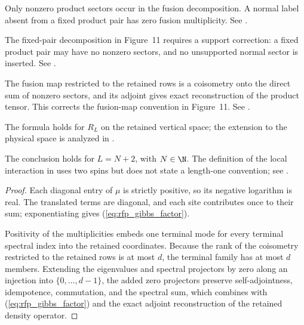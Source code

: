 \begin{lemma}
    Only nonzero product sectors occur in the fusion decomposition. A normal
    label absent from a fixed product pair has zero fusion multiplicity. See
    \cite{gap:cpsv16_bnt_uniqueness_zero_coefficient}.

    The fixed-pair decomposition in Figure~11 requires a support correction:
    a fixed product pair may have no nonzero sectors, and no unsupported
    normal sector is inserted. See
    \cite{gap:cpsv16_figure11_per_pair_support}.

    The fusion map restricted to the retained rows is a coisometry onto the
    direct sum of nonzero sectors, and its adjoint gives exact reconstruction
    of the product tensor. This corrects the fusion-map convention in
    Figure~11. See
    \cite{gap:cpsv16_figure11_fusion_coisometry}.

    The formula holds for $R_L$ on the retained vertical space; the extension to
    the physical space is analyzed in
    \cite{gap:cpsv16_topological_gibbs_physical_complement}.

    The conclusion holds for $L=N+2$, with $N\in\N$. The definition of the
    local interaction in \cite{Cirac2016MPDO_arXiv} uses two spins but does
    not state a length-one convention; see
    \cite{gap:cpsv16_topological_gibbs_length_one}.
\end{lemma}
\begin{proof}\leanok
    Each diagonal entry of $\mu$ is strictly positive, so its negative
    logarithm is real. The translated terms are diagonal, and each site
    contributes once to their sum; exponentiating gives
    (\ref{eq:rfp_gibbs_factor}).

    Positivity of the multiplicities embeds one terminal mode for every
    terminal spectral index into the retained coordinates. Because the rank of
    the coisometry restricted to the retained rows is at most $d$, the
    terminal family has at most $d$ members. Extending the eigenvalues and
    spectral projectors by zero along an injection into $\{0,\ldots,d-1\}$,
    the added zero projectors preserve self-adjointness, idempotence,
    commutation, and the spectral sum, which combines with
    (\ref{eq:rfp_gibbs_factor}) and the exact adjoint reconstruction of the
    retained density operator.
\end{proof}

